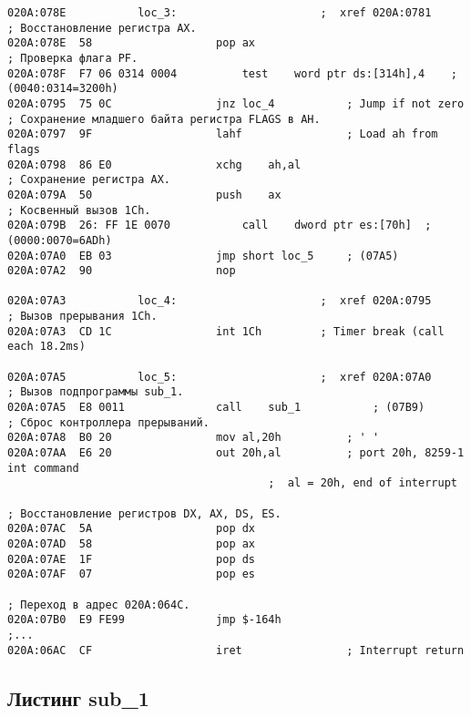 \begin{lstlisting}[style={asm}]
020A:078E			loc_3:						;  xref 020A:0781
; Восстановление регистра AX.
020A:078E  58					pop	ax
; Проверка флага PF.
020A:078F  F7 06 0314 0004			test	word ptr ds:[314h],4	; (0040:0314=3200h)
020A:0795  75 0C				jnz	loc_4			; Jump if not zero
; Сохранение младшего байта регистра FLAGS в AH.
020A:0797  9F					lahf				; Load ah from flags
020A:0798  86 E0				xchg	ah,al
; Сохранение регистра AX.
020A:079A  50					push	ax
; Косвенный вызов 1Ch.
020A:079B  26: FF 1E 0070			call	dword ptr es:[70h]	; (0000:0070=6ADh)
020A:07A0  EB 03				jmp	short loc_5		; (07A5)
020A:07A2  90					nop

020A:07A3			loc_4:						;  xref 020A:0795
; Вызов прерывания 1Ch.
020A:07A3  CD 1C				int	1Ch			; Timer break (call each 18.2ms)

020A:07A5			loc_5:						;  xref 020A:07A0
; Вызов подпрограммы sub_1.
020A:07A5  E8 0011				call	sub_1			; (07B9)
; Сброс контроллера прерываний.
020A:07A8  B0 20				mov	al,20h			; ' '
020A:07AA  E6 20				out	20h,al			; port 20h, 8259-1 int command
										;  al = 20h, end of interrupt

; Восстановление регистров DX, AX, DS, ES.
020A:07AC  5A					pop	dx
020A:07AD  58					pop	ax
020A:07AE  1F					pop	ds
020A:07AF  07					pop	es

; Переход в адрес 020A:064C.
020A:07B0  E9 FE99				jmp	$-164h
;...
020A:06AC  CF					iret				; Interrupt return
\end{lstlisting}

\clearpage

\subsection*{Листинг sub\_1}


